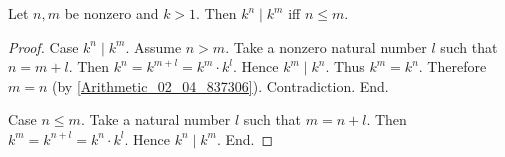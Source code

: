 \documentclass[../../arithmetic.tex]{subfiles}
\begin{document}
\begin{forthel}
    \begin{proposition}\label{Arithmetic_03_01_499003}
      Let $n,m$ be nonzero and $k > 1$.
      Then $k^{n} \mid k^{m}$ iff $n \leq m$.
    \end{proposition}
    \begin{proof}
      Case $k^{n} \mid k^{m}$.
        Assume $n > m$.
        Take a nonzero natural number $l$ such that $n = m + l$.
        Then $k^{n} = k^{m + l} = k^{m} \cdot k^{l}$.
        Hence $k^{m} \mid k^{n}$.
        Thus $k^{m} = k^{n}$.
        Therefore $m = n$ (by \ref{Arithmetic_02_04_837306}).
        Contradiction.
      End.

      Case $n \leq m$.
        Take a natural number $l$ such that $m = n + l$.
        Then $k^{m} = k^{n + l} = k^{n} \cdot k^{l}$.
        Hence $k^{n} \mid k^{m}$.
      End.
    \end{proof}
  \end{forthel}
\end{document}
